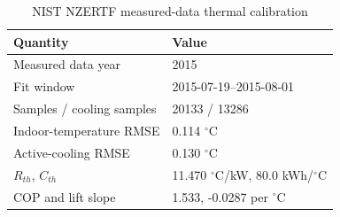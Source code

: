 \begin{table}[!t]
\caption{NIST NZERTF measured-data thermal calibration}
\label{tab:nist_calibration}
\centering
\begin{tabular}{ll}
\toprule
Quantity & Value \\
\midrule
Measured data year & 2015 \\
Fit window & 2015-07-19--2015-08-01 \\
Samples / cooling samples & 20133 / 13286 \\
Indoor-temperature RMSE & 0.114 $^\circ$C \\
Active-cooling RMSE & 0.130 $^\circ$C \\
$R_{th}$, $C_{th}$ & 11.470 $^\circ$C/kW, 80.0 kWh/$^\circ$C \\
COP and lift slope & 1.533, -0.0287 per $^\circ$C \\
\bottomrule
\end{tabular}
\end{table}
